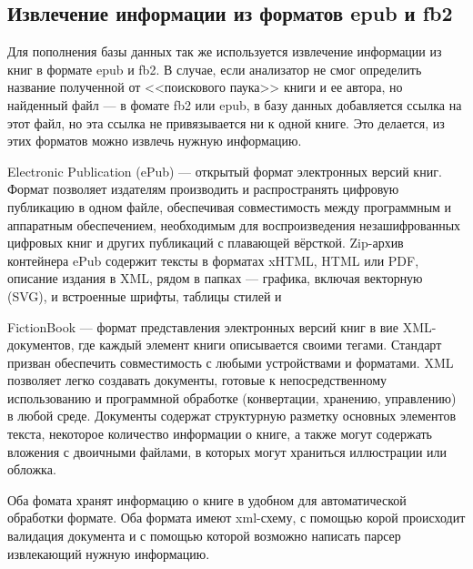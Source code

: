 \subsection{Извлечение информации из форматов epub и fb2}

Для пополнения базы данных так же используется извлечение информации из книг в формате epub и fb2. В случае, если анализатор не смог определить название полученной от <<поискового паука>> книги и ее автора, но найденный файл --- в фомате fb2 или epub, в базу данных добавляется ссылка на этот файл, но эта ссылка не привязывается ни к одной книге. Это делается, \tk из этих форматов можно извлечь нужную информацию. 

Electronic Publication (ePub) \cite{epub} — открытый формат электронных версий книг. Формат позволяет издателям производить и распространять цифровую публикацию в одном файле, обеспечивая совместимость между программным и аппаратным обеспечением, необходимым для воспроизведения незашифрованных цифровых книг и других публикаций с плавающей вёрсткой.
Zip-архив контейнера ePub содержит тексты в форматах xHTML, HTML или PDF, описание издания в XML, рядом в папках — графика, включая векторную (SVG), и встроенные шрифты, таблицы стилей и \td 

FictionBook \cite{fb2} — формат представления электронных версий книг в вие XML-документов, где каждый элемент книги описывается своими тегами. Стандарт призван обеспечить совместимость с любыми устройствами и форматами. XML позволяет легко создавать документы, готовые к непосредственному использованию и программной обработке (конвертации, хранению, управлению) в любой среде. Документы содержат структурную разметку основных элементов текста, некоторое количество информации о книге, а также могут содержать вложения с двоичными файлами, в которых могут храниться иллюстрации или обложка.

Оба фомата хранят информацию о книге в удобном для автоматической обработки формате. Оба формата имеют xml-схему, с помощью корой происходит валидация документа и с помощью которой возможно написать парсер извлекающий нужную информацию.